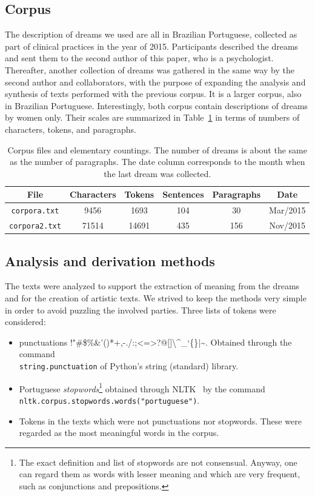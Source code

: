 \documentclass[12pt,fleqn]{article}
\begin{document}
\subsection{Corpus}
The description of dreams we used are all in Brazilian Portuguese,
collected as part of clinical practices in the year of 2015.
Participants described the dreams and sent them to the second author of this paper, who is a psychologist.
Thereafter, another collection of dreams was gathered in the same way by the second author and collaborators,
with the purpose of expanding the analysis and synthesis of texts performed with the previous
corpus.
It is a larger corpus, also in Brazilian Portuguese.
Interestingly, both corpus contain descriptions of dreams by women only.
Their scales are summarized in Table~\ref{tab:dreams} in terms of numbers of characters, tokens,
and paragraphs.

\begin{table}[H] %
	\caption{Corpus files and elementary countings.
	The number of dreams is about the same as the number of paragraphs.
	The date column corresponds to  the month when the last dream was collected.}\label{tab:dreams}
\vspace{12pt}
\centering{}
	\begin{tabular}{  c || c | c | c | c | c }
		\textbf{File}           & \textbf{Characters} & \textbf{Tokens} & \textbf{Sentences} & \textbf{Paragraphs} & \textbf{Date} \\\hline
		\texttt{corpora.txt}  & 9456 & 1693 & 104 & 30 & Mar/2015 \\
		\texttt{corpora2.txt}  & 71514 & 14691 & 435 & 156 & Nov/2015 \\
\end{tabular}
\end{table}

\subsection{Analysis and derivation methods}
The texts were analyzed to support the extraction of meaning from the dreams
and for the creation of artistic texts.
We strived to keep the methods very simple in order to avoid puzzling the involved parties.
Three lists of tokens were considered:
\begin{itemize}
	\item punctuations !"\#\$\%\&'()*+,-./:;<=>?@[]\textbackslash\textasciicircum\_`\{\}|\textasciitilde. Obtained through the command \\ \texttt{string.punctuation} of Python's string (standard) library.
	\item Portuguese \emph{stopwords}\footnote{The exact definition and list of stopwords are not consensual.
		Anyway, one can regard them as words with lesser meaning and which are very frequent, such as conjunctions and prepositions.}
		obtained through NLTK~\citep{nltk} by the command \\ \texttt{nltk.corpus.stopwords.words("portuguese")}.
	\item Tokens in the texts which were not punctuations nor stopwords.
		These were regarded as the most meaningful words in the corpus.
\end{itemize}
\end{document}
